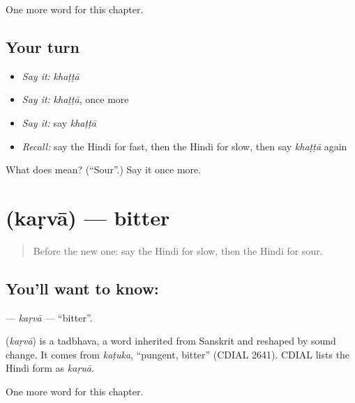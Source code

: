 \begin{grammarlens}[title={What you've built}]
One more word for this chapter.
\end{grammarlens}

\subsection*{Your turn}
\begin{itemize}
\raggedright
  \item \emph{Say it:} \emph{khaṭṭā}
  \item \emph{Say it:} \emph{khaṭṭā}, once more
  \item \emph{Say it:} say \emph{khaṭṭā}
  \item \emph{Recall:} say the Hindi for fast, then the Hindi for slow, then say \emph{khaṭṭā} again
\end{itemize}

\begin{tcolorbox}[breakable,colback=teal!4,colframe=teal!35!black,title={Before you move on}]
What does  mean? (\textquotedblleft{}Sour\textquotedblright{}.) Say it once more.
\end{tcolorbox}
\section[\texorpdfstring{\hi{कड़वा} (kaṛvā)}{कड़वा (kaṛvā)}]{ (kaṛvā) — bitter}

\label{lesson:HI-C156-karva}



\begin{quote}
Before the new one: say the Hindi for slow, then the Hindi for sour.
\end{quote}

\subsection*{You'll want to know: }
\textbf{} — \emph{kaṛvā} — \textquotedblleft{}bitter\textquotedblright{}.

\begin{cousinweb}
\textbf{} (\emph{kaṛvā}) is a tadbhava, a word inherited from Sanskrit and reshaped by sound change. It comes from \emph{kaṭuka}, \textquotedblleft{}pungent, bitter\textquotedblright{} (CDIAL 2641). CDIAL lists the Hindi form as \emph{kaṛuā}.
\end{cousinweb}

\begin{grammarlens}[title={What you've built}]
One more word for this chapter.
\end{grammarlens}

